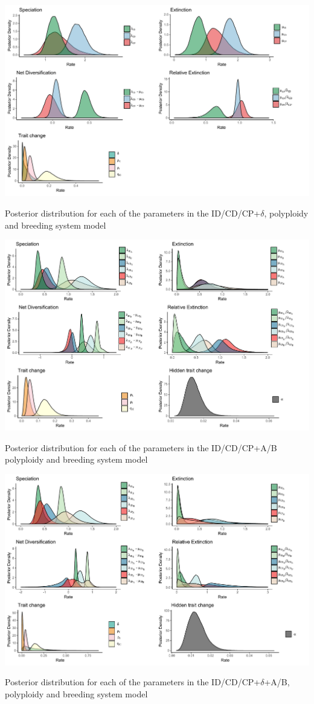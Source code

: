 \begin{suppfigure}
\includegraphics[width=\textwidth]{musseDPSIposteriordist.pdf}
\caption{Posterior distribution for each of the parameters in the ID/CD/CP+$\delta$, polyploidy and breeding system model} %
\label{suppfigure:IDCDCP}
\end{suppfigure}

\begin{suppfigure}
\includegraphics[width=\textwidth]{muhisseDPSInodipposteriordist.pdf}
\caption{Posterior distribution for each of the parameters in the ID/CD/CP+A/B polyploidy and breeding system model} %
\label{suppfigure:IDCDCPnodipAB}
\end{suppfigure}

\begin{suppfigure}
\includegraphics[width=\textwidth]{muhisseDPSIposteriordist.pdf}
\caption{Posterior distribution for each of the parameters in the ID/CD/CP+$\delta$+A/B, polyploidy and breeding system model} %
\label{suppfigure:IDCDCPAB}
\end{suppfigure}


